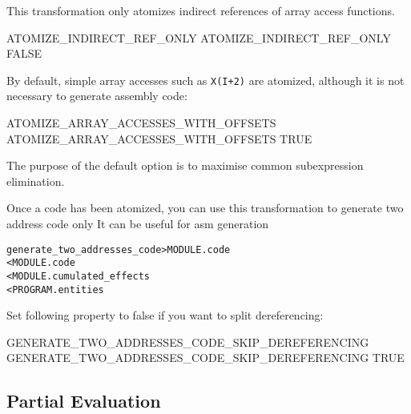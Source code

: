 \documentclass[a4paper]{report}
\newenvironment{PipsMake}{\begin{alltt}}{\end{alltt}}
\newenvironment{PipsPass}[1]{\label{pass:#1}}{}
\begin{document}
This transformation only atomizes indirect references of array access
functions.

\begin{PipsProp}{ATOMIZE_INDIRECT_REF_ONLY}
ATOMIZE_INDIRECT_REF_ONLY FALSE
\end{PipsProp}

By default, simple array accesses such as \verb/X(I+2)/ are atomized,
although it is not necessary to generate assembly code:

\begin{PipsProp}{ATOMIZE_ARRAY_ACCESSES_WITH_OFFSETS}
ATOMIZE_ARRAY_ACCESSES_WITH_OFFSETS TRUE
\end{PipsProp}

The purpose of the default option is to maximise common subexpression
elimination.

\begin{PipsPass}{generate_two_addresses_code}
Once a code has been atomized, you can use this transformation to generate two address code only
It can be useful for asm generation
\end{PipsPass}
\begin{PipsMake}
generate_two_addresses_code > MODULE.code
			< MODULE.code
			< MODULE.cumulated_effects
			< PROGRAM.entities
\end{PipsMake}
Set following property to false if you want to split dereferencing:
\begin{PipsProp}{GENERATE_TWO_ADDRESSES_CODE_SKIP_DEREFERENCING}
GENERATE_TWO_ADDRESSES_CODE_SKIP_DEREFERENCING TRUE
\end{PipsProp}




\subsection{Partial Evaluation}
\label{sec:partial-evaluation}
\end{document}
